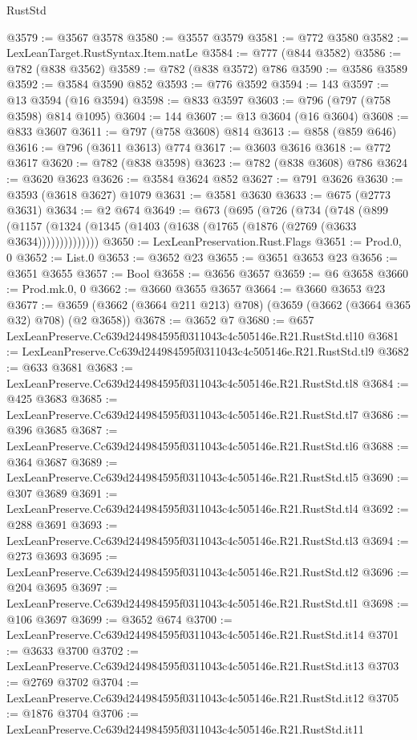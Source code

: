 \begin{lexlean}{RustStd}
\begin{coremodule}
@3579 := @3567 @3578
@3580 := @3557 @3579
@3581 := @772 @3580
@3582 := LexLeanTarget.RustSyntax.Item.natLe
@3584 := @777 (@844 @3582)
@3586 := @782 (@838 @3562)
@3589 := @782 (@838 @3572) @786
@3590 := @3586 @3589
@3592 := @3584 @3590 @852
@3593 := @776 @3592
@3594 := 143
@3597 := @13 @3594 (@16 @3594)
@3598 := @833 @3597
@3603 := @796 (@797 (@758 @3598) @814 @1095)
@3604 := 144
@3607 := @13 @3604 (@16 @3604)
@3608 := @833 @3607
@3611 := @797 (@758 @3608) @814
@3613 := @858 (@859 @646)
@3616 := @796 (@3611 @3613) @774
@3617 := @3603 @3616
@3618 := @772 @3617
@3620 := @782 (@838 @3598)
@3623 := @782 (@838 @3608) @786
@3624 := @3620 @3623
@3626 := @3584 @3624 @852
@3627 := @791 @3626
@3630 := @3593 (@3618 @3627) @1079
@3631 := @3581 @3630
@3633 := @675 (@2773 @3631)
@3634 := @2 @674
@3649 := @673
    (@695
      (@726
        (@734
          (@748
            (@899 (@1157 (@1324 (@1345 (@1403 (@1638 (@1765 (@1876 (@2769 (@3633 @3634))))))))))))))
@3650 := LexLeanPreservation.Rust.Flags
@3651 := Prod.{0, 0}
@3652 := List.{0}
@3653 := @3652 @23
@3655 := @3651 @3653 @23
@3656 := @3651 @3655
@3657 := Bool
@3658 := @3656 @3657
@3659 := @6 @3658
@3660 := Prod.mk.{0, 0}
@3662 := @3660 @3655 @3657
@3664 := @3660 @3653 @23
@3677 := @3659 (@3662 (@3664 @211 @213) @708) (@3659 (@3662 (@3664 @365 @32) @708) (@2 @3658))
@3678 := @3652 @7
@3680 := @657 LexLeanPreserve.Cc639d244984595f0311043c4c505146e.R21.RustStd.tl10
@3681 := LexLeanPreserve.Cc639d244984595f0311043c4c505146e.R21.RustStd.tl9
@3682 := @633 @3681
@3683 := LexLeanPreserve.Cc639d244984595f0311043c4c505146e.R21.RustStd.tl8
@3684 := @425 @3683
@3685 := LexLeanPreserve.Cc639d244984595f0311043c4c505146e.R21.RustStd.tl7
@3686 := @396 @3685
@3687 := LexLeanPreserve.Cc639d244984595f0311043c4c505146e.R21.RustStd.tl6
@3688 := @364 @3687
@3689 := LexLeanPreserve.Cc639d244984595f0311043c4c505146e.R21.RustStd.tl5
@3690 := @307 @3689
@3691 := LexLeanPreserve.Cc639d244984595f0311043c4c505146e.R21.RustStd.tl4
@3692 := @288 @3691
@3693 := LexLeanPreserve.Cc639d244984595f0311043c4c505146e.R21.RustStd.tl3
@3694 := @273 @3693
@3695 := LexLeanPreserve.Cc639d244984595f0311043c4c505146e.R21.RustStd.tl2
@3696 := @204 @3695
@3697 := LexLeanPreserve.Cc639d244984595f0311043c4c505146e.R21.RustStd.tl1
@3698 := @106 @3697
@3699 := @3652 @674
@3700 := LexLeanPreserve.Cc639d244984595f0311043c4c505146e.R21.RustStd.it14
@3701 := @3633 @3700
@3702 := LexLeanPreserve.Cc639d244984595f0311043c4c505146e.R21.RustStd.it13
@3703 := @2769 @3702
@3704 := LexLeanPreserve.Cc639d244984595f0311043c4c505146e.R21.RustStd.it12
@3705 := @1876 @3704
@3706 := LexLeanPreserve.Cc639d244984595f0311043c4c505146e.R21.RustStd.it11

\end{coremodule}
\end{lexlean}
